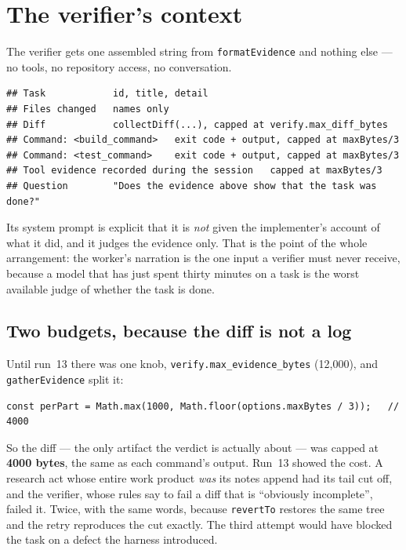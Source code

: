 \documentclass[11pt,a4paper]{article}
\newcommand{\file}[1]{\texttt{#1}}
\newcommand{\key}[1]{\texttt{#1}}
\begin{document}
\section{The verifier's context}
\label{sec:evidence}

The verifier gets one assembled string from \file{formatEvidence} and nothing
else --- no tools, no repository access, no conversation.

\begin{lstlisting}
## Task            id, title, detail
## Files changed   names only
## Diff            collectDiff(...), capped at verify.max_diff_bytes
## Command: <build_command>   exit code + output, capped at maxBytes/3
## Command: <test_command>    exit code + output, capped at maxBytes/3
## Tool evidence recorded during the session   capped at maxBytes/3
## Question        "Does the evidence above show that the task was done?"
\end{lstlisting}

Its system prompt is explicit that it is \emph{not} given the implementer's
account of what it did, and it judges the evidence only. That is the point of
the whole arrangement: the worker's narration is the one input a verifier must
never receive, because a model that has just spent thirty minutes on a task is
the worst available judge of whether the task is done.

\subsection{Two budgets, because the diff is not a log}

Until run~13 there was one knob, \key{verify.max\_evidence\_bytes} (12{,}000),
and \file{gatherEvidence} split it:

\begin{lstlisting}
const perPart = Math.max(1000, Math.floor(options.maxBytes / 3));   // 4000
\end{lstlisting}

So the diff --- the only artifact the verdict is actually about --- was capped
at \textbf{4000 bytes}, the same as each command's output. Run~13 showed the
cost. A research act whose entire work product \emph{was} its notes append had
its tail cut off, and the verifier, whose rules say to fail a diff that is
``obviously incomplete'', failed it. Twice, with the same words, because
\file{revertTo} restores the same tree and the retry reproduces the cut exactly.
The third attempt would have blocked the task on a defect the harness
introduced.
\end{document}
